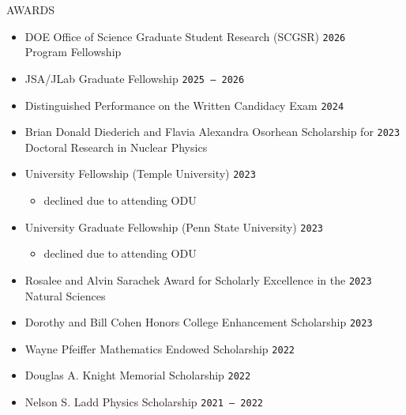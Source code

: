 \documentclass[10pt,a4paper]{article}
\def\bline{\vspace*{0.2cm}}
\newcommand\datetf[2]{\texttt{#1\,--\,#2}}
\newcommand\datei[1]{\texttt{#1}}
\newenvironment{cvsection}[1]
{
{\LARGE #1} \hrulefill
\vspace*{3ex}
}
{
\vspace*{3ex}
}
\begin{document}
\begin{cvsection}{AWARDS}

\begin{itemize}[nosep,leftmargin=*,label=$\circ$]

\item DOE Office of Science Graduate Student Research (SCGSR) \hfill \datei{2026} \\ Program Fellowship
\item JSA/JLab Graduate Fellowship \hfill \datetf{2025}{2026}
\item Distinguished Performance on the Written Candidacy Exam \hfill \datei{2024}
\item Brian Donald Diederich and Flavia Alexandra Osorhean Scholarship for \hfill \datei{2023} \\ Doctoral Research in Nuclear Physics

\item University Fellowship (Temple University) \hfill \datei{2023}
\begin{itemize}[nosep,leftmargin=*,label=$-$]
    \item declined due to attending ODU
\end{itemize}

\item University Graduate Fellowship (Penn State University) \hfill \datei{2023}
\begin{itemize}[nosep,leftmargin=*,label=$-$]
    \item declined due to attending ODU
\end{itemize}

\item Rosalee and Alvin Sarachek Award for Scholarly Excellence in the \hfill \datei{2023} \\ Natural Sciences

\item Dorothy and Bill Cohen Honors College Enhancement Scholarship \hfill \datei{2023}

\item Wayne Pfeiffer Mathematics Endowed Scholarship \hfill \datei{2022}
%
\item Douglas A. Knight Memorial Scholarship \hfill \datei{2022}
%
\item Nelson S. Ladd Physics Scholarship \hfill \datetf{2021}{2022}
%


\end{itemize}
\end{cvsection}
\end{document}
